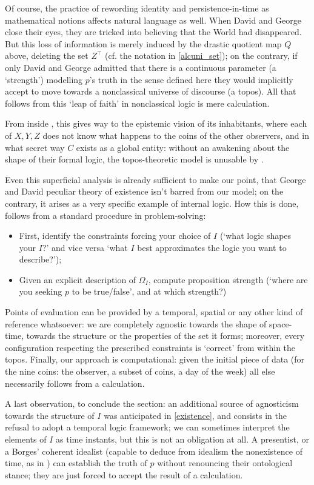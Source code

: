 Of course, the practice of rewording identity and persistence-in-time as mathematical notions affects natural language as well. When David and George close their eyes, they are tricked into believing that the World had disappeared. But this loss of information is merely induced by the drastic quotient map $Q$ above, deleting the set $Z^\top$ (cf. the notation in \autoref{alcuni_set}); on the contrary, if only David and George admitted that there is a continuous parameter (a `strength') modelling $p$'s truth in the sense defined here they would implicitly accept to move towards a nonclassical universe of discourse (a topos). All that follows from this `leap of faith' in nonclassical logic is mere calculation.

From inside \tlon, this gives way to the epistemic vision of its inhabitants, where each of $X,Y,Z$ does not know what happens to the coins of the other observers, and in what secret way $C$ exists as a global entity: without an awakening about the shape of their formal logic, the topos-theoretic model is unusable by \tlonians.

Even this superficial analysis is already sufficient to make our point, that George and David peculiar theory of existence isn't barred from our model; on the contrary, it arises as a very specific example of internal logic. How this is done, follows from a standard procedure in problem-solving:
\begin{itemize}
  \item First, identify the constraints forcing your choice of $I$ (`what logic shapes your $I$?' and vice versa `what $I$ best approximates the logic you want to describe?');
  \item Given an explicit description of $\Omega_I$, compute proposition strength (`where are you seeking $p$ to be true/false', and at which strength?)
\end{itemize}
Points of evaluation can be provided by a temporal, spatial or any other kind of reference whatsoever: we are completely agnostic towards the shape of space-time, towards the structure or the properties of the set it forms; moreover, every configuration respecting the prescribed constraints is `correct' from within the topos. Finally, our approach is computational: given the initial piece of data (for the nine coins: the observer, a subset of coins, a day of the week) all else necessarily follows from a calculation.

A last observation, to conclude the section: an additional source of agnosticism towards the structure of $I$ was anticipated in \autoref{existence}, and consists in the refusal to adopt a temporal logic framework; we can sometimes interpret the elements of $I$ as time instants, but this is not an obligation at all. A presentist, or a Borges' coherent idealist (capable to deduce from idealism the nonexistence of time, as in \cite{confutacion}) can establish the truth of $p$ without renouncing their ontological stance; they are just forced to accept the result of a calculation.

